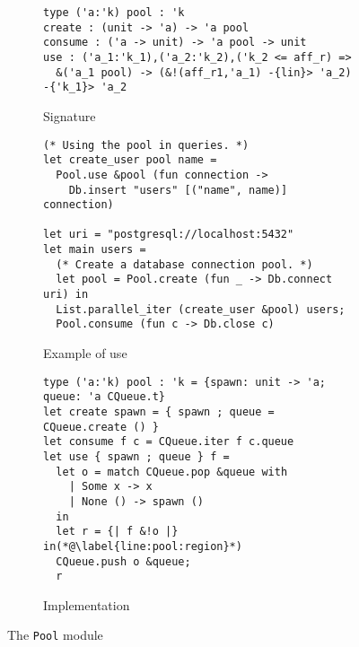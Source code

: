 \begin{figure}[tp]
  \centering
  \begin{subfigure}[t]{1\linewidth}
\begin{lstlisting}
type ('a:'k) pool : 'k
create : (unit -> 'a) -> 'a pool
consume : ('a -> unit) -> 'a pool -> unit
use : ('a_1:'k_1),('a_2:'k_2),('k_2 <= aff_r) =>
  &('a_1 pool) -> (&!(aff_r1,'a_1) -{lin}> 'a_2) -{'k_1}> 'a_2
\end{lstlisting}
    \vspace{-10pt}
    \caption{Signature}
    \label{intf:pool}

\begin{lstlisting}
(* Using the pool in queries. *)
let create_user pool name =
  Pool.use &pool (fun connection ->
    Db.insert "users" [("name", name)] connection)

let uri = "postgresql://localhost:5432"
let main users =
  (* Create a database connection pool. *)
  let pool = Pool.create (fun _ -> Db.connect uri) in
  List.parallel_iter (create_user &pool) users;
  Pool.consume (fun c -> Db.close c)
\end{lstlisting}
    \vspace{-10pt}
    \caption{Example of use}
    \label{ex:pool}
  \end{subfigure}

  \begin{subfigure}[t]{1\linewidth}
\begin{lstlisting}
type ('a:'k) pool : 'k = {spawn: unit -> 'a; queue: 'a CQueue.t}
let create spawn = { spawn ; queue = CQueue.create () }
let consume f c = CQueue.iter f c.queue
let use { spawn ; queue } f =
  let o = match CQueue.pop &queue with
    | Some x -> x
    | None () -> spawn ()
  in
  let r = {| f &!o |} in(*@\label{line:pool:region}*)
  CQueue.push o &queue;
  r
\end{lstlisting}
    \vspace{-15pt}
    \caption{Implementation}
    \label{impl:pool}
  \end{subfigure}

  \caption{The \texttt{Pool} module}
  \label{fig:pool}
\end{figure}

